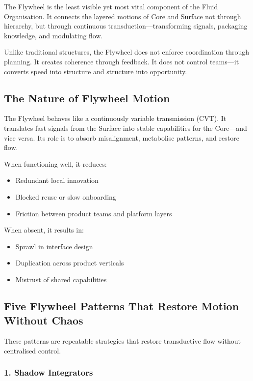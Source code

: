 \documentclass[12pt]{article}
\begin{document}
The Flywheel is the least visible yet most vital component of the Fluid Organisation. It connects the layered motions of Core and Surface not through hierarchy, but through continuous transduction---transforming signals, packaging knowledge, and modulating flow.

Unlike traditional structures, the Flywheel does not enforce coordination through planning. It creates coherence through feedback. It does not control teams---it converts speed into structure and structure into opportunity.

\subsection*{The Nature of Flywheel Motion}

The Flywheel behaves like a continuously variable transmission (CVT). It translates fast signals from the Surface into stable capabilities for the Core---and vice versa. Its role is to absorb misalignment, metabolise patterns, and restore flow.

When functioning well, it reduces:
\begin{itemize}
    \item Redundant local innovation
    \item Blocked reuse or slow onboarding
    \item Friction between product teams and platform layers
\end{itemize}

When absent, it results in:
\begin{itemize}
    \item Sprawl in interface design
    \item Duplication across product verticals
    \item Mistrust of shared capabilities
\end{itemize}

\subsection{Five Flywheel Patterns That Restore Motion Without Chaos}

These patterns are repeatable strategies that restore transductive flow without centralised control.

\subsubsection*{1. Shadow Integrators}
\end{document}

